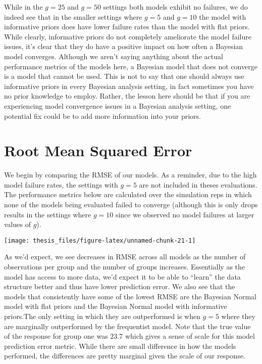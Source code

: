 \documentclass[12pt,twoside]{reedthesis}
\begin{document}
While in the \(g = 25\) and \(g = 50\) settings both models exhibit no failures, we do indeed see that in the smaller settings where \(g = 5\) and \(g = 10\) the model with informative priors does have lower failure rates than the model with flat priors. While clearly, informative priors do not completely ameliorate the model failure issues, it's clear that they do have a positive impact on how often a Bayesian model converges. Although we aren't saying anything about the actual performance metrics of the models here, a Bayesian model that does not converge is a model that cannot be used. This is not to say that one should always use informative priors in every Bayesian analysis setting, in fact sometimes you have no prior knowledge to employ. Rather, the lesson here should be that if you are experiencing model convergence issues in a Bayesian analysis setting, one potential fix could be to add more information into your priors.

\hypertarget{root-mean-squared-error}{%
\section{Root Mean Squared Error}\label{root-mean-squared-error}}

We begin by comparing the RMSE of our models. As a reminder, due to the high model failure rates, the settings with \(g = 5\) are not included in theses evaluations. The performance metrics below are calculated over the simulation reps in which none of the models being evaluated failed to converge (although this is only drops results in the settings where \(g = 10\) since we observed no model failures at larger values of \(g\)).
\begin{center}\texttt{[image: thesis\_files/figure-latex/unnamed-chunk-21-1]} \end{center}

As we'd expect, we see decreases in RMSE across all models as the number of observations per group and the number of groups increases. Essentially as the model has access to more data, we'd expect it to be able to ``learn'' the data structure better and thus have lower prediction error. We also see that the models that consistently have some of the lowest RMSE are the Bayesian Normal model with flat priors and the Bayesian Normal model with informative priors.The only setting in which they are outperformed is when \(g = 5\) where they are marginally outperformed by the frequentist model. Note that the true value of the response for group one was \(23.7\) which gives a sense of scale for this model prediction error metric. While there are small difference in how the models performed, the differences are pretty marginal given the scale of our response.
\end{document}
